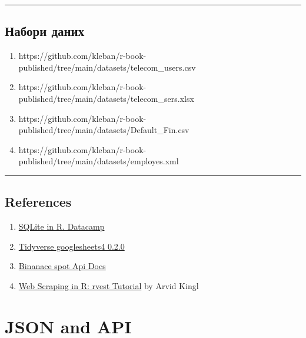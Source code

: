\documentclass[
  letterpaper,
  DIV=11,
  numbers=noendperiod]{scrreprt}
\providecommand{\tightlist}{%
  \setlength{\itemsep}{0pt}\setlength{\parskip}{0pt}}\usepackage{longtable,booktabs,array}
\begin{document}
\begin{center}\rule{0.5\linewidth}{0.5pt}\end{center}

\section{Набори
даних}\label{ux43dux430ux431ux43eux440ux438-ux434ux430ux43dux438ux445-2}

\begin{enumerate}
\def\labelenumi{\arabic{enumi}.}
\tightlist
\item
  https://github.com/kleban/r-book-published/tree/main/datasets/telecom\_users.csv
\item
  https://github.com/kleban/r-book-published/tree/main/datasets/telecom\_sers.xlsx
\item
  https://github.com/kleban/r-book-published/tree/main/datasets/Default\_Fin.csv
\item
  https://github.com/kleban/r-book-published/tree/main/datasets/employes.xml
\end{enumerate}

\begin{center}\rule{0.5\linewidth}{0.5pt}\end{center}

\section{References}\label{references-2}

\begin{enumerate}
\def\labelenumi{\arabic{enumi}.}
\tightlist
\item
  \href{https://www.datacamp.com/community/tutorials/sqlite-in-r}{SQLite
  in R. Datacamp}
\item
  \href{https://www.tidyverse.org/blog/2020/05/googlesheets4-0-2-0/}{Tidyverse
  googlesheets4 0.2.0}
\item
  \href{https://github.com/binance/binance-spot-api-docs/blob/master/rest-api.md\#klinecandlestick-data}{Binanace
  spot Api Docs}
\item
  \href{https://www.datacamp.com/community/tutorials/r-web-scraping-rvest}{Web
  Scraping in R: rvest Tutorial} by Arvid Kingl
\end{enumerate}

\chapter{JSON and API}\label{json-and-api}
\end{document}
